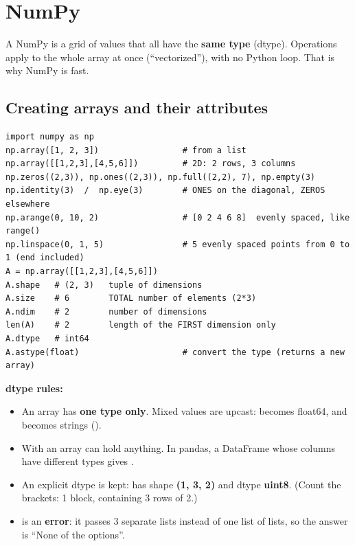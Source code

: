 \newpage
\section{NumPy}

\begin{idea}
A NumPy  is a grid of values that all have the \textbf{same type} (dtype). Operations apply to the whole array at once (``vectorized''), with no Python loop. That is why NumPy is fast.
\end{idea}

\subsection{Creating arrays and their attributes}
\begin{codebox}
\begin{Verbatim}
import numpy as np
np.array([1, 2, 3])                 # from a list
np.array([[1,2,3],[4,5,6]])         # 2D: 2 rows, 3 columns
np.zeros((2,3)), np.ones((2,3)), np.full((2,2), 7), np.empty(3)
np.identity(3)  /  np.eye(3)        # ONES on the diagonal, ZEROS elsewhere
np.arange(0, 10, 2)                 # [0 2 4 6 8]  evenly spaced, like range()
np.linspace(0, 1, 5)                # 5 evenly spaced points from 0 to 1 (end included)
A = np.array([[1,2,3],[4,5,6]])
A.shape   # (2, 3)   tuple of dimensions
A.size    # 6        TOTAL number of elements (2*3)
A.ndim    # 2        number of dimensions
len(A)    # 2        length of the FIRST dimension only
A.dtype   # int64
A.astype(float)                     # convert the type (returns a new array)
\end{Verbatim}
\end{codebox}
\textbf{dtype rules:}
\begin{itemize}
  \item An array has \textbf{one type only}. Mixed values are upcast: \code{[1, 2.5]} becomes float64, and  becomes strings ().
  \item With  an array can hold anything. In pandas, a DataFrame whose columns have different types gives .
  \item An explicit dtype is kept:  has shape \textbf{(1, 3, 2)} and dtype \textbf{uint8}. (Count the brackets: 1 block, containing 3 rows of 2.)
  \item {} is an \textbf{error}: it passes 3 separate lists instead of one list of lists, so the answer is ``None of the options''.
\end{itemize}

